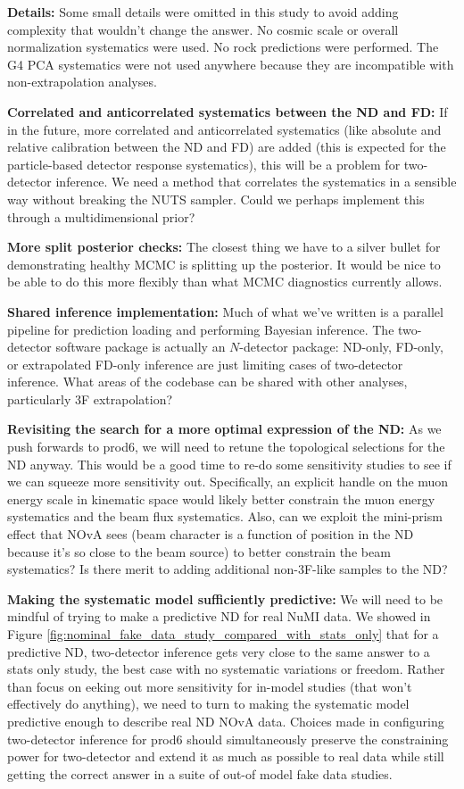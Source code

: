 \documentclass{article}
\begin{document}
\textbf{Details:} Some small details were omitted in this study to avoid adding complexity that wouldn't change the answer. No cosmic scale or overall normalization systematics were used. No rock predictions were performed. The G4 PCA systematics were not used anywhere because they are incompatible with non-extrapolation analyses.

\textbf{Correlated and anticorrelated systematics between the ND and FD:} If in the future, more correlated and anticorrelated systematics (like absolute and relative calibration between the ND and FD) are added (this is expected for the particle-based detector response systematics), this will be a problem for two-detector inference. We need a method that correlates the systematics in a sensible way without breaking the NUTS sampler. Could we perhaps implement this through a multidimensional prior?

\textbf{More split posterior checks:} The closest thing we have to a silver bullet for demonstrating healthy MCMC is splitting up the posterior. It would be nice to be able to do this more flexibly than what MCMC diagnostics currently allows.

\textbf{Shared inference implementation:} Much of what we've written is a parallel pipeline for prediction loading and performing Bayesian inference. The two-detector software package is actually an $N$-detector package: ND-only, FD-only, or extrapolated FD-only inference are just limiting cases of two-detector inference. What areas of the codebase can be shared with other analyses, particularly 3F extrapolation?

\textbf{Revisiting the search for a more optimal expression of the ND:} As we push forwards to prod6, we will need to retune the topological selections for the ND anyway. This would be a good time to re-do some sensitivity studies to see if we can squeeze more sensitivity out. Specifically, an explicit handle on the muon energy scale in kinematic space would likely better constrain the muon energy systematics and the beam flux systematics. Also, can we exploit the mini-prism effect that NOvA sees (beam character is a function of position in the ND because it's so close to the beam source) to better constrain the beam systematics? Is there merit to adding additional non-3F-like samples to the ND?

\textbf{Making the systematic model sufficiently predictive:} We will need to be mindful of trying to make a predictive ND for real NuMI data. We showed in Figure \ref{fig:nominal_fake_data_study_compared_with_stats_only} that for a predictive ND, two-detector inference gets very close to the same answer to a stats only study, the best case with no systematic variations or freedom. Rather than focus on eeking out more sensitivity for in-model studies (that won't effectively do anything), we need to turn to making the systematic model predictive enough to describe real ND NOvA data. Choices made in configuring two-detector inference for prod6 should simultaneously preserve the constraining power for two-detector and extend it as much as possible to real data while still getting the correct answer in a suite of out-of model fake data studies.

\FloatBarrier
\newpage
\printbibliography
\end{document}
